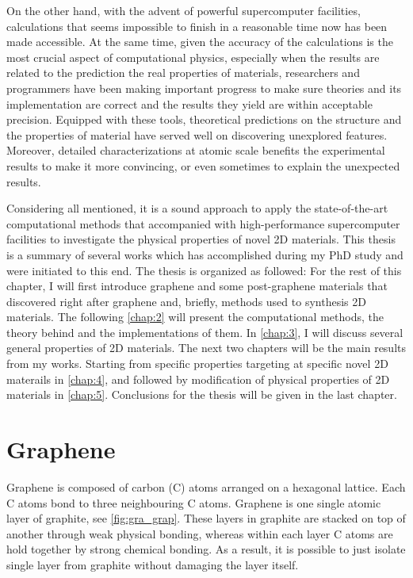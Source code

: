 On the other hand, with the advent of powerful supercomputer facilities, calculations that seems impossible to finish in a reasonable time now has been made accessible. At the same time, given the accuracy of the calculations is the most crucial aspect of computational physics, especially when the results are related to the prediction the real properties of materials, researchers and programmers have been making important progress to make sure theories and its implementation are correct and the results they yield are within acceptable precision. Equipped with these tools, theoretical predictions on the structure and the properties of material have served well on discovering unexplored features. Moreover, detailed characterizations at atomic scale benefits the experimental results to make it more convincing, or even sometimes to explain the unexpected results.


Considering all mentioned, it is a sound approach to apply the state-of-the-art computational methods that accompanied with high-performance supercomputer facilities to investigate the physical properties of novel 2D materials. This thesis is a summary of several works which has accomplished during my PhD study and were initiated to this end. The thesis is organized as followed: For the rest of this chapter, I will first introduce graphene and some post-graphene materials that discovered right after graphene and, briefly, methods used to synthesis 2D materials. The following \autoref{chap:2} will present the computational methods, the theory behind and the implementations of them. In \autoref{chap:3}, I will discuss several general properties of 2D materials. The next two chapters will be the main results from my works. Starting from specific properties targeting at specific novel 2D materails in \autoref{chap:4}, and followed by modification of physical properties of 2D materials in \autoref{chap:5}. Conclusions for the thesis will be given in the last chapter.

\section{Graphene}

Graphene is composed of carbon (C) atoms arranged on a hexagonal lattice. Each C atoms bond to three neighbouring C atoms. Graphene is one single atomic layer of graphite, see \autoref{fig:gra_grap}. These layers in graphite are stacked on top of another through weak physical bonding, whereas within each layer C atoms are hold together by strong chemical bonding. As a result, it is possible to just isolate single layer from graphite without damaging the layer itself. 

